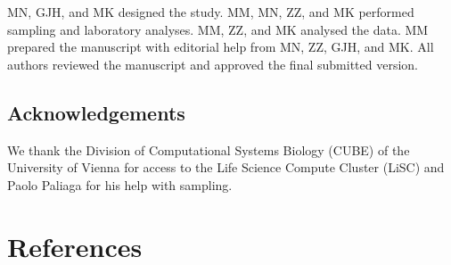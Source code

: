 \documentclass[
  12 pt,
]{article}
\begin{document}
MN, GJH, and MK designed the study. MM, MN, ZZ, and MK performed sampling and laboratory analyses. MM, ZZ, and MK analysed the data. MM prepared the manuscript with editorial help from MN, ZZ, GJH, and MK. All authors reviewed the manuscript and approved the final submitted version.

\hypertarget{acknowledgements}{%
\subsection{Acknowledgements}\label{acknowledgements}}

We thank the Division of Computational Systems Biology (CUBE) of the University of Vienna for access to the Life Science Compute Cluster (LiSC) and Paolo Paliaga for his help with sampling.

\newpage

\hypertarget{references}{%
\section{References}\label{references}}
\end{document}

